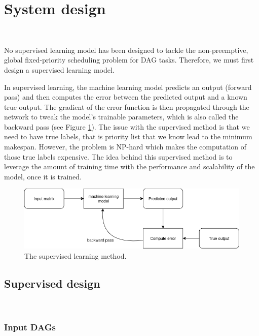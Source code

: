 \section{System design}
\label{sec:system_design}
~

No supervised learning model has been designed to 
tackle the non-preemptive, global fixed-priority scheduling problem 
for DAG tasks.
Therefore, we must first design a supervised learning model.

In supervised learning, the machine learning model 
predicts an output (forward pass) and then computes the error between
the predicted output and a known true output.
The gradient of the error function is then propagated through the network to tweak the model's 
trainable parameters, which is also called the backward pass (see Figure \ref{fig:supervised_learning}).
The issue with the supervised method is that we need to have true labels,
that is priority list that we know lead to the minimum makespan.
However, the problem is NP-hard which makes the computation
of those true labels expensive. The idea behind this supervised
method is to leverage the amount of training time with the performance
and scalability of the model, once it is trained.

\begin{figure}
    \centering
    \includegraphics[width=\linewidth]{images/supervised_learning_diagram.drawio.png}
    \caption{The supervised learning method.}
    \label{fig:supervised_learning}
\end{figure}

\subsection{Supervised design}
~

\subsubsection{Input DAGs}
~


